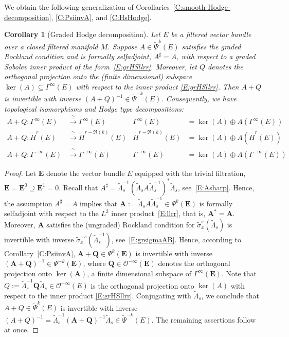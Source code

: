 \documentclass[reqno,12pt]{amsart}
\theoremstyle{plain}
\newtheorem{corollary}[theorem]{Corollary}
\theoremstyle{definition}
\begin{document}
We obtain the following generalization of Corollaries~\ref{C:smooth-Hodge-decomposition}, \ref{C:PsiinvA}, and \ref{C:HsHodge}.


\begin{corollary}[Graded Hodge decomposition]\label{C:graded-Hodge}
Let $E$ be a filtered vector bundle over a closed filtered manifold $M$.
Suppose $A\in\tilde\Psi^k(E)$ satisfies the graded Rockland condition and is formally selfadjoint, $A^\sharp=A$, with respect to a graded Sobolev inner product of the form~\eqref{E:grHSllrr}.
Moreover, let $Q$ denotes the orthogonal projection onto the (finite dimensional) subspace $\ker(A)\subseteq\Gamma^\infty(E)$ with respect to the inner product \eqref{E:grHSllrr}.
Then $A+Q$ is invertible with inverse $(A+Q)^{-1}\in\tilde\Psi^{-k}(E)$.
Consequently, we have topological isomorphisms and Hodge type decompositions:
\begin{align*}
A+Q\colon\Gamma^\infty(E)&\xrightarrow\cong\Gamma^\infty(E)&\Gamma^\infty(E)&=\ker(A)\oplus A(\Gamma^\infty(E))\\
A+Q\colon\tilde H^r(E)&\xrightarrow\cong\tilde H^{r-\Re(k)}(E)&\tilde H^{r-\Re(k)}(E)&=\ker(A)\oplus A(\tilde H^r(E))\\
A+Q\colon\Gamma^{-\infty}(E)&\xrightarrow\cong\Gamma^{-\infty}(E)&\Gamma^{-\infty}(E)&=\ker(A)\oplus A(\Gamma^{-\infty}(E))
\end{align*}
\end{corollary}


\begin{proof}
Let $\mathbf E$ denote the vector bundle $E$ equipped with the trivial filtration, $\mathbf E=\mathbf E^0\supseteq\mathbf E^1=0$.
Recall that $A^\sharp=\tilde\Lambda_s^{-1}(\tilde\Lambda_sA\tilde\Lambda_s^{-1})^*\tilde\Lambda_s$, see~\eqref{E:Asharp}.
Hence, the assumption $A^\sharp=A$ implies that $\mathbf A:=\tilde\Lambda_sA\tilde\Lambda_s^{-1}\in\Psi^k(\mathbf E)$ is formally selfadjoint with respect to the $L^2$ inner product~\eqref{E:llrr}, that is, $\mathbf A^*=\mathbf A$.
Moreover, $\mathbf A$ satisfies the (ungraded) Rockland condition for $\tilde\sigma^s_x(\tilde\Lambda_s)$ is invertible with inverse $\tilde\sigma^{-s}_x(\tilde\Lambda_s^{-1})$, see~\eqref{E:grsigmaAB}.
Hence, according to Corollary~\ref{C:PsiinvA}, $\mathbf A+\mathbf Q\in\Psi^k(\mathbf E)$ is invertible with inverse $(\mathbf A+\mathbf Q)^{-1}\in\Psi^{-k}(\mathbf E)$, where $\mathbf Q\in\mathcal O^{-\infty}(\mathbf E)$ denotes the orthogonal projection onto $\ker(\mathbf A)$, a finite dimensional subspace of $\Gamma^\infty(\mathbf E)$.
Note that $Q:=\tilde\Lambda_s^{-1}\mathbf Q\tilde\Lambda_s\in\mathcal O^{-\infty}(E)$ is the orthogonal projection onto $\ker(A)$ with respect to the inner product \eqref{E:grHSllrr}.
Conjugating with $\tilde\Lambda_s$, we conclude that $A+Q\in\tilde\Psi^k(E)$ is invertible with inverse $(A+Q)^{-1}=\tilde\Lambda_s^{-1}(\mathbf A+\mathbf Q)^{-1}\tilde\Lambda_s\in\tilde\Psi^{-k}(E)$.
The remaining assertions follow at once.
\end{proof}
\end{document}
